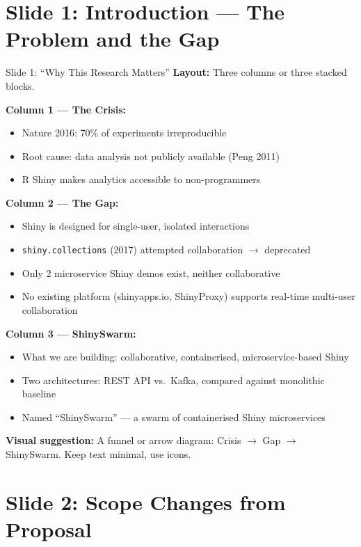 \documentclass[12pt,a4paper]{article}
\begin{document}
\section{Slide 1: Introduction --- The Problem and the Gap}

\begin{slidebox}{Slide 1: ``Why This Research Matters''}
\textbf{Layout:} Three columns or three stacked blocks.

\textbf{Column 1 --- The Crisis:}
\begin{itemize}[nosep]
  \item Nature 2016: 70\% of experiments irreproducible
  \item Root cause: data analysis not publicly available (Peng 2011)
  \item R Shiny makes analytics accessible to non-programmers
\end{itemize}

\textbf{Column 2 --- The Gap:}
\begin{itemize}[nosep]
  \item Shiny is designed for single-user, isolated interactions
  \item \texttt{shiny.collections} (2017) attempted collaboration $\rightarrow$ deprecated
  \item Only 2 microservice Shiny demos exist, neither collaborative
  \item No existing platform (shinyapps.io, ShinyProxy) supports real-time multi-user collaboration
\end{itemize}

\textbf{Column 3 --- ShinySwarm:}
\begin{itemize}[nosep]
  \item What we are building: collaborative, containerised, microservice-based Shiny
  \item Two architectures: REST API vs.\ Kafka, compared against monolithic baseline
  \item Named ``ShinySwarm'' --- a swarm of containerised Shiny microservices
\end{itemize}

\textbf{Visual suggestion:} A funnel or arrow diagram: Crisis $\rightarrow$ Gap $\rightarrow$ ShinySwarm. Keep text minimal, use icons.
\end{slidebox}

\section{Slide 2: Scope Changes from Proposal}
\end{document}
